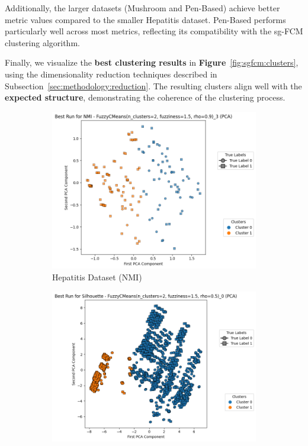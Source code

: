 Additionally, the larger datasets (Mushroom and Pen-Based) achieve better metric values compared to the smaller Hepatitis dataset. Pen-Based performs particularly well across most metrics, reflecting its compatibility with the sg-FCM clustering algorithm. 

Finally, we visualize the \textbf{best clustering results} in \textbf{Figure}~\ref{fig:sgfcm:clusters}, using the dimensionality reduction techniques described in Subsection~\ref{sec:methodology:reduction}. The resulting clusters align well with the \textbf{expected structure}, demonstrating the coherence of the clustering process.

\begin{figure}[H]
	\centering
	\begin{subfigure}{0.32\textwidth}
		\centering
		\includegraphics[width=\linewidth]{figures/FuzzyCMeans/Hepatitis/best_run_NMI.png}
		\caption{Hepatitis Dataset (NMI)}
	\end{subfigure}
	\hfill
	\begin{subfigure}{0.32\textwidth}
		\centering
		\includegraphics[width=\linewidth]{figures/FuzzyCMeans/Mushroom/best_run_Silhouette.png}

\end{subfigure}
\end{figure}
